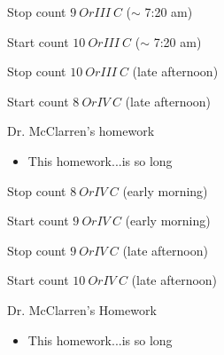 \documentclass[idxtotoc,hyperref,openany,oneside]{labbook} %
\newcommand{\cmark}{\ding{51}}%
\newcommand{\done}{\rlap{$\square$}{\raisebox{2pt}{\large\hspace{1pt}\cmark}}%
  \hspace{-2.5pt}}
\begin{document}


\begin{todolist}
\item[\done]{Stop count $\boxed{9\ OrIII\ C}$ ($\sim$ 7:20 am)}
\item[\done]{Start count $\boxed{10\ OrIII\ C}$ ($\sim$ 7:20 am)}
\item[\done]{Stop count $\boxed{10\ OrIII\ C}$ (late afternoon)}
\item[\done]{Start count $\boxed{8\ OrIV\ C}$ (late afternoon)}
\end{todolist}


\begin{todolist}
\item{Dr. McClarren's homework}
  \begin{itemize}
  \item{This homework...is so long}
  \end{itemize}
\end{todolist}




\begin{todolist}
\item[\done]{Stop count $\boxed{8\ OrIV\ C}$ (early morning)}
\item[\done]{Start count $\boxed{9\ OrIV\ C}$ (early morning)}
\item[\done]{Stop count $\boxed{9\ OrIV\ C}$ (late afternoon)}
\item[\done]{Start count $\boxed{10\ OrIV\ C}$ (late afternoon)}
\end{todolist}


\begin{todolist}
\item{Dr. McClarren's Homework}
  \begin{itemize}
  \item{This homework...is so long}
  \end{itemize}
\end{todolist}


\end{document}

